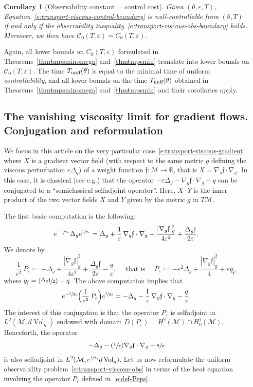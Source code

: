 \documentclass[10pt]{amsart}
\newcommand{\unif}{\textup{unif}}
\newcommand{\Psfrac}[2]{(\sfrac{#1}{#2})}
\newtheorem{corollary}[lemma]{Corollary}
\theoremstyle{definition}
\newcommand{\M}{\ensuremath{\mathcal M}}
\newcommand{\calC}{\ensuremath{\mathcal C}}
\newcommand{\mb}[1]{\ensuremath{\mathbb{#1}}}
\newcommand{\R}{{\mb{R}}}
\newcommand{\f}{\ensuremath{\mathfrak{f}}}
\DeclareMathOperator{\Vol}{Vol}
\newcommand\Lap{\Delta_{g}}
\newcommand\nablag{\nabla_{g}}
\let\eps\varepsilon
\let\q q
\newcommand{\qf}{q_{\f}}
\providecommand{\eg}{e.g.}\providecommand{\ie}{i.e.}\providecommand{\etc}{etc.}
\let\Subsection\subsection\let\Subsubsection\subsubsection
\begin{document}
\begin{corollary}[Observability constant = control cost]
Given $(\theta, \eps, T)$, Equation~\eqref{e:transport-viscous-control-boundary} is null-controllable from $(\theta, T)$ if and only if the observability inequality~\eqref{e:transport-viscous-obs-boundary} holds.
Moreover, we then have $\mathcal{C}_0(T,\eps)= C_0(T,\eps)$.
\end{corollary}
Again, all lower bounds on $C_0(T,\eps)$ formulated in Theorems~\ref{thmtmpsminomega} and~\ref{thmtmpsmin} translate into lower bounds on $\calC_0(T,\eps)$. The time $T_{\unif}(\theta)$ is equal to the minimal time of uniform {\em controllability}, and all lower bounds on the time $T_{\unif}(\theta)$ obtained in Theorems~\ref{thmtmpsminomega} and~\ref{thmtmpsmin} and their corollaries apply.

\Subsection{The vanishing viscosity limit for gradient flows. Conjugation and reformulation}
\label{sectconjug}

We focus in this article on the very particular case~\eqref{e:transport-viscous-gradient} where $X$ is a gradient vector field (with respect to the same metric $g$ defining the viscous perturbation $\eps \Lap$) of a weight function $\f : \M\to \R$, that is $X = \nablag \f \cdot \nablag$. In this case, it is classical (see \eg \cite{Witten:82,HS:85}) that the operator $-\eps \Lap - \nablag \f \cdot \nablag-\q$ can be conjugated to a ``semiclassical selfadjoint operator''. Here, $X\cdot Y$ is the inner product of the two vector fields $X$ and $Y$ given by the metric $g$ in $T\M$.

The first basic computation is the following:
\[
e^{-\sfrac{\f}{2\eps}} \Lap e^{\sfrac{\f}{2\eps}} = \Lap + \frac{1}{\eps}\,\nablag \f \cdot \nablag + \frac{|\nablag \f|_g^2}{4\eps^2} + \frac{\Lap \f}{2\eps}.
\]
We denote by
\begin{equation}
\label{e:def-Peps}
\frac{1}{\eps^2}\,P_\eps := - \Lap + \frac{|\nablag \f|_g^2}{4\eps^2} + \frac{\Lap \f}{2\eps}-\frac{ \q}{\eps}, \quad \text{ that is } \quad P_\eps := - \eps^2 \Lap + \frac{|\nablag \f|_g^2}{4} + \eps \qf,
\end{equation}
where $\qf= \Psfrac{\Lap \f}{2}-\q$. The above computation implies that
\begin{equation}
\label{e:trans-eps}
e^{-\sfrac{\f}{2\eps}} \Bigl( \frac{1}{\eps^2}\,P_\eps \Bigr)e^{\sfrac{\f}{2\eps}} = - \Lap - \frac{1}{\eps}\,\nablag \f \cdot \nablag-\frac{\q}{\eps}.
\end{equation}
The interest of this conjugation is that the operator $P_\eps$ is selfadjoint in $L^2(\M,d\Vol_g)$ endowed with domain $D(P_\eps) = H^2(\M)\cap H^1_0(\M)$. Henceforth, the operator
\[
- \Lap - \Psfrac{1}{\eps}\nablag \f \cdot \nablag-\sfrac{\q}{\eps}
\]
is also selfadjoint in $L^2(\M, e^{\sfrac{\f}{2\eps}} d\Vol_g)$.
Let us now reformulate the uniform observability problem~\eqref{e:transport-viscous-obs} in terms of the heat equation involving the operator $P_\eps$ defined in~\eqref{e:def-Peps}.
\end{document}
